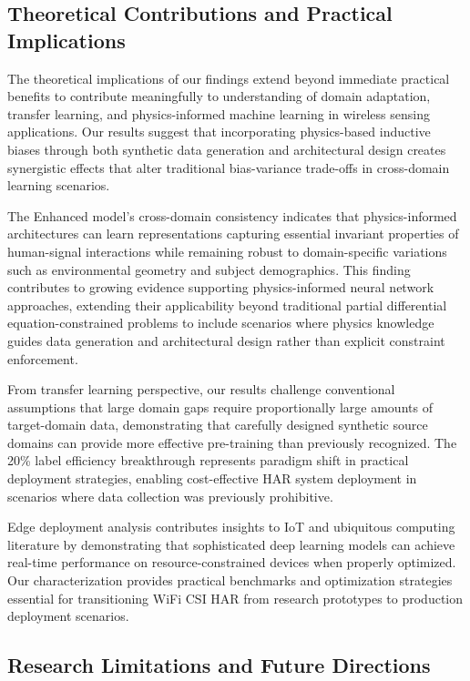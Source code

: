 \documentclass[journal]{IEEEtran}
\begin{document}
\subsection{Theoretical Contributions and Practical Implications}

The theoretical implications of our findings extend beyond immediate practical benefits to contribute meaningfully to understanding of domain adaptation, transfer learning, and physics-informed machine learning in wireless sensing applications. Our results suggest that incorporating physics-based inductive biases through both synthetic data generation and architectural design creates synergistic effects that alter traditional bias-variance trade-offs in cross-domain learning scenarios.

The Enhanced model's cross-domain consistency indicates that physics-informed architectures can learn representations capturing essential invariant properties of human-signal interactions while remaining robust to domain-specific variations such as environmental geometry and subject demographics. This finding contributes to growing evidence supporting physics-informed neural network approaches, extending their applicability beyond traditional partial differential equation-constrained problems to include scenarios where physics knowledge guides data generation and architectural design rather than explicit constraint enforcement.

From transfer learning perspective, our results challenge conventional assumptions that large domain gaps require proportionally large amounts of target-domain data, demonstrating that carefully designed synthetic source domains can provide more effective pre-training than previously recognized. The 20\% label efficiency breakthrough represents paradigm shift in practical deployment strategies, enabling cost-effective HAR system deployment in scenarios where data collection was previously prohibitive.

Edge deployment analysis contributes insights to IoT and ubiquitous computing literature by demonstrating that sophisticated deep learning models can achieve real-time performance on resource-constrained devices when properly optimized. Our characterization provides practical benchmarks and optimization strategies essential for transitioning WiFi CSI HAR from research prototypes to production deployment scenarios.

\subsection{Research Limitations and Future Directions}
\end{document}
